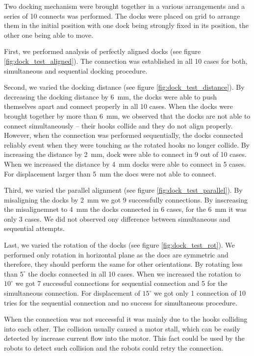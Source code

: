 Two docking mechanism were brought together in a various arrangements and a
series of 10 connects was performed. The docks were placed on grid to arrange
them in the initial position with one dock being strongly fixed in its position,
the other one being able to move.

First, we performed analysis of perfectly aligned docks (see figure
\ref{fig:dock_test_aligned}). The connection was established in all 10 cases for
both, simultaneous and sequential docking procedure.

Second, we varied the docking distance (see figure
\ref{fig:dock_test_distance}). By decreasing the docking distance by 6~mm, the
docks were able to push themselves apart and connect properly in all 10 cases.
When the docks were brought together by more than 6~mm, we observed that the
docks are not able to connect simultaneously -- their hooks collide and they do
not align properly. However, when the connection was performed sequentially, the
docks connected reliably event when they were touching as the rotated hooks no
longer collide. By increasing the distance by 2~mm, dock were able to connect in
9 out of 10 cases. When we increased the distance by 4~mm docks were able to
connect in 5 cases. For displacement larger than 5~mm the docs were not able to
connect.

Third, we varied the parallel alignment (see figure
\ref{fig:dock_test_parallel}). By misaligning the docks by 2~mm we got 9
successfully connections. By inscreasing the misalignemnet to 4~mm the docks
connected in 6 cases, for the 6~mm it was only 3 cases. We did not observed ony
difference between simultaneous and sequential attempts.

Last, we varied the rotation of the docks (see figure \ref{fig:dock_test_rot}).
We performed only rotation in horizontal plane as the docs are symmetric and
therefore, they should perform the same for other orientations. By rotating less
than $5^\circ$ the docks connected in all 10 cases. When we increased the
rotation to $10^\circ$ we got 7 successful connections for sequential connection
and 5 for the simultaneous connection. For displacement of $15^\circ$ we got
only 1 connection of 10 tries for the sequential connection and no success for
simultaneous procedure.

When the connection was not successful it was mainly due to the hooks colliding
into each other. The collision usually caused a motor stall, which can be easily
detected by increase current flow into the motor. This fact could be used by the
robots to detect such collision and the robots could retry the connection.

